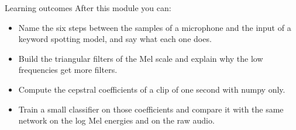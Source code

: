 \begin{frame}{Learning outcomes}
  After this module you can:
  \begin{itemize}
    \item Name the six steps between the samples of a microphone and the
          input of a keyword spotting model, and say what each one does.
    \item Build the triangular filters of the Mel scale and explain why the
          low frequencies get more filters.
    \item Compute the cepstral coefficients of a clip of one second with
          numpy only.
    \item Train a small classifier on those coefficients and compare it
          with the same network on the log Mel energies and on the raw
          audio.
  \end{itemize}
\end{frame}